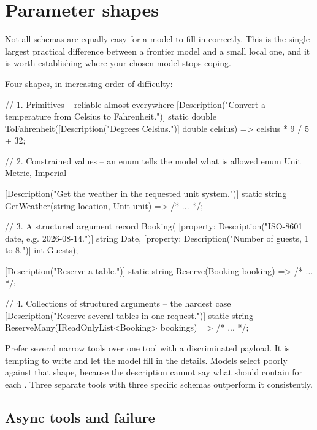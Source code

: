 \section{Parameter shapes}
\label{sec:param-shapes}

Not all schemas are equally easy for a model to fill in correctly. This is the
single largest practical difference between a frontier model and a small local
one, and it is worth establishing where your chosen model stops coping.

Four shapes, in increasing order of difficulty:

\begin{csharp}[caption={Four parameter shapes}, label={lst:tool-shapes}]
// 1. Primitives -- reliable almost everywhere
[Description("Convert a temperature from Celsius to Fahrenheit.")]
static double ToFahrenheit([Description("Degrees Celsius.")] double celsius)
    => celsius * 9 / 5 + 32;

// 2. Constrained values -- an enum tells the model what is allowed
enum Unit { Metric, Imperial }

[Description("Get the weather in the requested unit system.")]
static string GetWeather(string location, Unit unit) => /* ... */;

// 3. A structured argument
record Booking(
    [property: Description("ISO-8601 date, e.g. 2026-08-14.")] string Date,
    [property: Description("Number of guests, 1 to 8.")] int Guests);

[Description("Reserve a table.")]
static string Reserve(Booking booking) => /* ... */;

// 4. Collections of structured arguments -- the hardest case
[Description("Reserve several tables in one request.")]
static string ReserveMany(IReadOnlyList<Booking> bookings) => /* ... */;
\end{csharp}

\begin{note}
Prefer several narrow tools over one tool with a discriminated payload. It is
tempting to write  and
let the model fill in the details. Models select poorly against that shape,
because the description cannot say what  should contain for each
. Three separate tools with three specific schemas outperform it
consistently.
\end{note}

\subsection{Async tools and failure}

